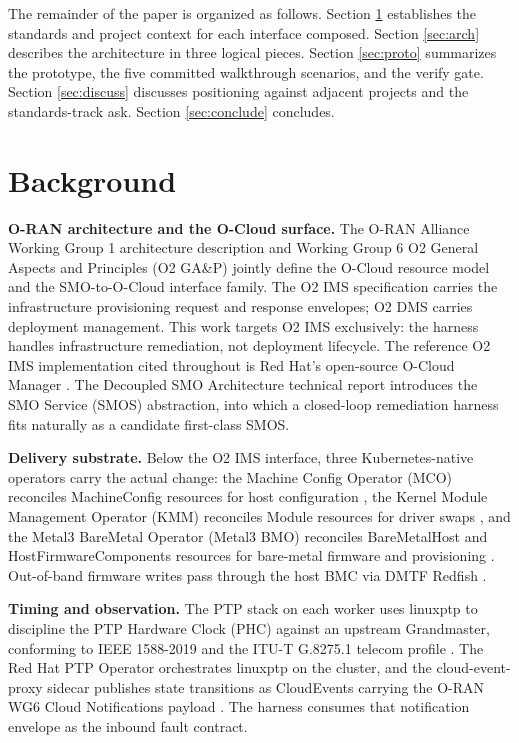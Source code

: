 \documentclass[twocolumn,10pt,a4paper]{article}
\begin{document}
The remainder of the paper is organized as follows. Section \ref{sec:background} establishes the standards and project context for each interface composed. Section \ref{sec:arch} describes the architecture in three logical pieces. Section \ref{sec:proto} summarizes the prototype, the five committed walkthrough scenarios, and the verify gate. Section \ref{sec:discuss} discusses positioning against adjacent projects and the standards-track ask. Section \ref{sec:conclude} concludes.

\section{Background}
\label{sec:background}

\textbf{O-RAN architecture and the O-Cloud surface.} The O-RAN Alliance Working Group 1 architecture description \cite{oran_wg1_arch} and Working Group 6 O2 General Aspects and Principles (O2 GA\&P) \cite{oran_o2_ganp} jointly define the O-Cloud resource model and the SMO-to-O-Cloud interface family. The O2 IMS specification \cite{oran_o2_ims} carries the infrastructure provisioning request and response envelopes; O2 DMS \cite{oran_o2_dms} carries deployment management. This work targets O2 IMS exclusively: the harness handles infrastructure remediation, not deployment lifecycle. The reference O2 IMS implementation cited throughout is Red Hat's open-source O-Cloud Manager \cite{oran_o2ims_ocm}. The Decoupled SMO Architecture technical report \cite{oran_decoupled_smo} introduces the SMO Service (SMOS) abstraction, into which a closed-loop remediation harness fits naturally as a candidate first-class SMOS.

\textbf{Delivery substrate.} Below the O2 IMS interface, three Kubernetes-native operators carry the actual change: the Machine Config Operator (MCO) reconciles MachineConfig resources for host configuration \cite{openshift_mco}, the Kernel Module Management Operator (KMM) reconciles Module resources for driver swaps \cite{kmm_operator}, and the Metal3 BareMetal Operator (Metal3 BMO) reconciles BareMetalHost and HostFirmwareComponents resources for bare-metal firmware and provisioning \cite{metal3_project,metal3_bmo}. Out-of-band firmware writes pass through the host BMC via DMTF Redfish \cite{dmtf_redfish}.

\textbf{Timing and observation.} The PTP stack on each worker uses linuxptp \cite{linuxptp_ptp4l} to discipline the PTP Hardware Clock (PHC) against an upstream Grandmaster, conforming to IEEE 1588-2019 \cite{ieee_1588_2019} and the ITU-T G.8275.1 telecom profile \cite{itu_g82751}. The Red Hat PTP Operator \cite{redhat_ptp_operator} orchestrates linuxptp on the cluster, and the cloud-event-proxy sidecar \cite{cloud_event_proxy} publishes state transitions as CloudEvents \cite{cncf_cloudevents} carrying the O-RAN WG6 Cloud Notifications payload \cite{oran_cloud_notifications}. The harness consumes that notification envelope as the inbound fault contract.
\end{document}
